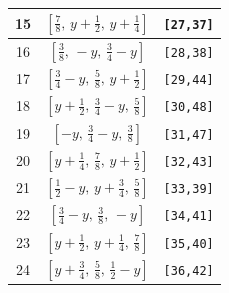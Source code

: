 \documentclass[fleqn,8pt]{jsarticle}
\begin{document}
\begin{longtable}{ccc}
15 & $\left[ \frac{7}{8},\, y + \frac{1}{2},\, y + \frac{1}{4} \right]$ & {\tt [27,37]} \\ \hline
16 & $\left[ \frac{3}{8},\, - y,\, \frac{3}{4} - y \right]$ & {\tt [28,38]} \\ \hline
17 & $\left[ \frac{3}{4} - y,\, \frac{5}{8},\, y + \frac{1}{2} \right]$ & {\tt [29,44]} \\ \hline
18 & $\left[ y + \frac{1}{2},\, \frac{3}{4} - y,\, \frac{5}{8} \right]$ & {\tt [30,48]} \\ \hline
19 & $\left[ - y,\, \frac{3}{4} - y,\, \frac{3}{8} \right]$ & {\tt [31,47]} \\ \hline
20 & $\left[ y + \frac{1}{4},\, \frac{7}{8},\, y + \frac{1}{2} \right]$ & {\tt [32,43]} \\ \hline
21 & $\left[ \frac{1}{2} - y,\, y + \frac{3}{4},\, \frac{5}{8} \right]$ & {\tt [33,39]} \\ \hline
22 & $\left[ \frac{3}{4} - y,\, \frac{3}{8},\, - y \right]$ & {\tt [34,41]} \\ \hline
23 & $\left[ y + \frac{1}{2},\, y + \frac{1}{4},\, \frac{7}{8} \right]$ & {\tt [35,40]} \\ \hline
24 & $\left[ y + \frac{3}{4},\, \frac{5}{8},\, \frac{1}{2} - y \right]$ & {\tt [36,42]} \\
\end{longtable}
\renewcommand{\arraystretch}{1.2}
\end{document}
